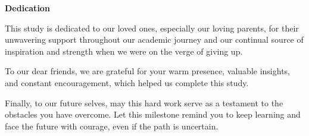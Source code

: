 \begin{center}
	\textbf{Dedication}
\end{center}

This study is dedicated to our loved ones, especially our loving parents, for their unwavering support throughout our academic journey and our continual source of inspiration and strength when we were on the verge of giving up.

To our dear friends, we are grateful for your warm presence, valuable insights, and constant encouragement, which helped us complete this study. 

Finally, to our future selves, may this hard work serve as a testament to the obstacles you have overcome. Let this milestone remind you to keep learning and face the future with courage, even if the path is uncertain. 
